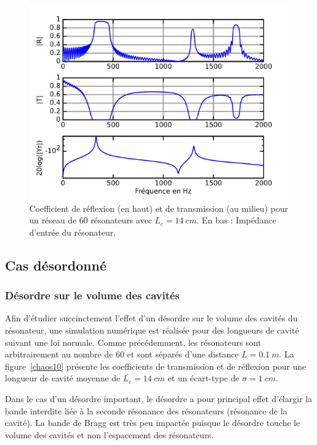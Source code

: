 \begin{figure}
\centering
\includegraphics[scale=0.7]{./images_chp1/ex_coef_rapport.png}
\caption{\label{ex_coef_RT} Coefficient de réflexion (en haut) et de transmission (au milieu) pour un réseau de 60 résonateurs avec $L_c=14~cm$. En bas : Impédance d'entrée du résonateur.}
\end{figure}

\subsection{Cas désordonné}

\subsubsection{Désordre sur le volume des cavités}

Afin d'étudier succinctement l'effet d'un désordre sur le volume des cavités du résonateur, une simulation numérique est réalisée pour des longueurs de cavité suivant une loi normale. Comme précédemment, les résonateurs sont arbitrairement au nombre de 60 et sont séparés d'une distance $L=0.1~m$. La figure~\ref{chaos10} présente les coefficients de transmission et de réflexion pour une longueur de cavité moyenne de $\bar{L_c}=14~cm$ et un écart-type  de $\sigma = 1~cm$.


Dans le cas d'un désordre important, le désordre a pour principal effet d'élargir la bande interdite liée à la seconde résonance des résonateurs (résonance de la cavité). La bande de Bragg est très peu impactée puisque le désordre touche le volume des cavités et non l'espacement des résonateurs.

